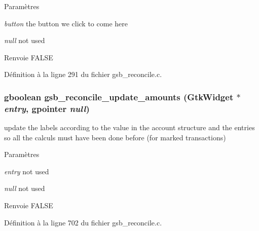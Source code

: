 \begin{DoxyParams}{Paramètres}
\item[{\em button}]the button we click to come here \item[{\em null}]not used\end{DoxyParams}
\begin{DoxyReturn}{Renvoie}
FALSE 
\end{DoxyReturn}


Définition à la ligne 291 du fichier gsb\_\-reconcile.c.

\subsubsection[{gsb\_\-reconcile\_\-update\_\-amounts}]{\setlength{\rightskip}{0pt plus 5cm}gboolean gsb\_\-reconcile\_\-update\_\-amounts (GtkWidget $\ast$ {\em entry}, \/  gpointer {\em null})}\label{gsb__reconcile_8h_ad4e6ccb1415c9f71f856acbb73ce8be3}
update the labels according to the value in the account structure and the entries so all the calculs must have been done before (for marked transactions)


\begin{DoxyParams}{Paramètres}
\item[{\em entry}]not used \item[{\em null}]not used\end{DoxyParams}
\begin{DoxyReturn}{Renvoie}
FALSE 
\end{DoxyReturn}


Définition à la ligne 702 du fichier gsb\_\-reconcile.c.

